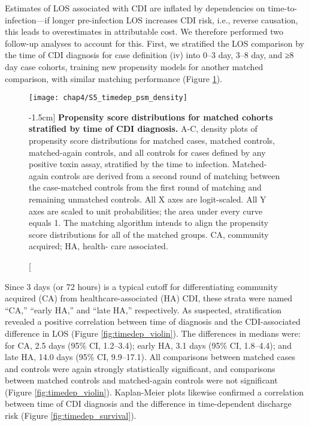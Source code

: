 Estimates of LOS associated with CDI are inflated by dependencies on time-to-infection—if longer pre-infection LOS increases CDI risk, i.e., reverse causation, this leads to overestimates in attributable cost.\autocite{Mitchell2014,Stevens2015} We therefore performed two follow-up analyses to account for this. First, we stratified the LOS comparison by the time of CDI diagnosis for case definition (iv) into 0–3 day, 3–8 day, and ≥8 day case cohorts, training new propensity models for another matched comparison, with similar matching performance (Figure \ref{fig:timedep_psm_density}).
\begin{figure}[htb]
  \texttt{[image: chap4/S5\_timedep\_psm\_density]}
  \caption[Propensity score distributions for matched cohorts stratified by time of CDI diagnosis][-1.5cm]{
    \textbf{Propensity score distributions for matched cohorts stratified by time of CDI diagnosis.} A-C, density plots of propensity score distributions for matched cases, matched controls, matched-again controls, and all controls for cases defined by any positive toxin assay, stratified by the time to infection. Matched-again controls are derived from a second round of matching between the case-matched controls from the first round of matching and remaining unmatched controls. All X axes are logit-scaled. All Y axes are scaled to unit probabilities; the area under every curve equals 1. The matching algorithm intends to align the propensity score distributions for all of the matched groups. CA, community acquired; HA, health- care associated.
  }
  \label{fig:timedep_psm_density}
\end{figure}
Since 3 days (or 72 hours) is a typical cutoff for differentiating community acquired (CA) from healthcare-associated (HA) CDI,\autocite{Longtin2016,Polage2015} these strata were named “CA,” “early HA,” and “late HA,” respectively. As suspected, stratification revealed a positive correlation between time of diagnosis and the CDI-associated difference in LOS (Figure \ref{fig:timedep_violin}). The differences in medians were: for CA, 2.5 days (95\% CI, 1.2–3.4); early HA, 3.1 days (95\% CI, 1.8–4.4); and late HA, 14.0 days (95\% CI, 9.9–17.1). All comparisons between matched cases and controls were again strongly statistically significant, and comparisons between matched controls and matched-again controls were not significant (Figure \ref{fig:timedep_violin}). Kaplan-Meier plots likewise confirmed a correlation between time of CDI diagnosis and the difference in time-dependent discharge risk (Figure \ref{fig:timedep_survival}).

